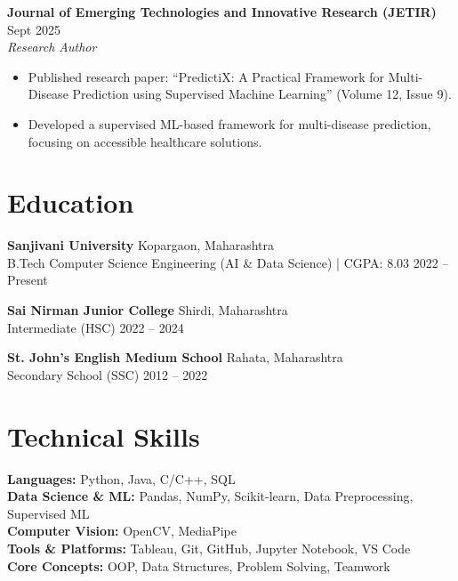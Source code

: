 \documentclass[10pt,letterpaper]{article}
\begin{document}
\vspace{2pt}

\noindent \textbf{Journal of Emerging Technologies and Innovative Research (JETIR)} \hfill Sept 2025 \\
\textit{Research Author}
\begin{itemize}[noitemsep, topsep=0pt, leftmargin=1.5em]
    \item Published research paper: ``PredictiX: A Practical Framework for Multi-Disease Prediction using Supervised Machine Learning'' (Volume 12, Issue 9).
    \item Developed a supervised ML-based framework for multi-disease prediction, focusing on accessible healthcare solutions.
\end{itemize}

\section*{Education}
\noindent \textbf{Sanjivani University} \hfill Kopargaon, Maharashtra \\
B.Tech Computer Science Engineering (AI \& Data Science) | CGPA: 8.03 \hfill 2022 -- Present

\vspace{2pt}

\noindent \textbf{Sai Nirman Junior College} \hfill Shirdi, Maharashtra \\
Intermediate (HSC) \hfill 2022 -- 2024

\vspace{2pt}

\noindent \textbf{St. John's English Medium School} \hfill Rahata, Maharashtra \\
Secondary School (SSC) \hfill 2012 -- 2022

\section*{Technical Skills}
\noindent \textbf{Languages:} Python, Java, C/C++, SQL \\
\textbf{Data Science \& ML:} Pandas, NumPy, Scikit-learn, Data Preprocessing, Supervised ML \\
\textbf{Computer Vision:} OpenCV, MediaPipe \\
\textbf{Tools \& Platforms:} Tableau, Git, GitHub, Jupyter Notebook, VS Code \\
\textbf{Core Concepts:} OOP, Data Structures, Problem Solving, Teamwork
\end{document}
